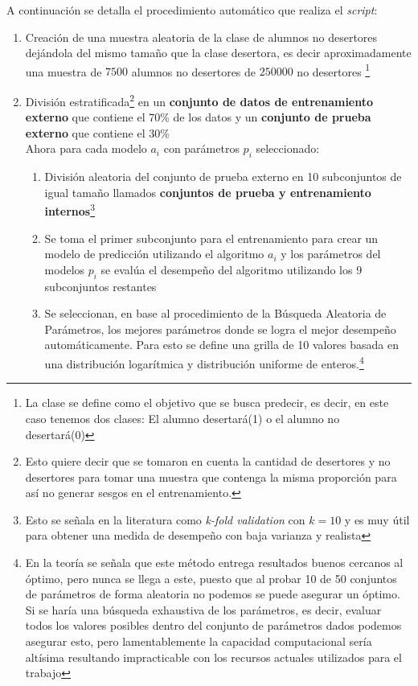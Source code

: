 \begin{enumerate}
A continuación se detalla el procedimiento automático que realiza el \textit{script}:\\
\begin{enumerate}
\item Creación de una muestra aleatoria de la clase de alumnos no desertores dejándola del mismo tamaño que la clase desertora, es decir aproximadamente una muestra de $7500$ alumnos no desertores de $250000$ no desertores \footnote{La clase se define como el objetivo que se busca predecir, es decir, en este caso tenemos dos clases: El alumno desertará(1) o el alumno no desertará(0)}
\item División estratificada\footnote{Esto quiere decir que se tomaron en cuenta la cantidad de desertores y no desertores para tomar una muestra que contenga la misma proporción para así no generar sesgos en el entrenamiento.} en un \textbf{conjunto de datos de entrenamiento externo} que contiene el 70\% de los datos y un \textbf{conjunto de prueba externo} que contiene el 30\%
\\ \hfill
Ahora para cada modelo $a_i$ con parámetros $p_i$ seleccionado:
    \begin{enumerate}
    \item División aleatoria del conjunto de prueba externo en 10 subconjuntos de igual tamaño llamados \textbf{conjuntos de prueba y entrenamiento internos}\footnote{Esto se señala en la literatura como \textit{k-fold validation} con $k = 10$ y es muy útil para obtener una medida de desempeño con baja varianza y realista}
    \item Se toma el primer subconjunto para el entrenamiento para crear un modelo de predicción utilizando el algoritmo $a_i$ y los parámetros del modelos $p_i$ se evalúa el desempeño del algoritmo utilizando los 9 subconjuntos restantes
    \item Se seleccionan, en base al procedimiento de la Búsqueda Aleatoria de Parámetros, los mejores parámetros donde se logra el mejor desempeño automáticamente. Para esto se define una grilla de 10 valores basada en una distribución logarítmica y distribución uniforme de enteros.\footnote{En la teoría se señala que este método entrega resultados buenos cercanos al óptimo, pero nunca se llega a este, puesto que al probar 10 de 50 conjuntos de parámetros de forma aleatoria no podemos se puede asegurar un óptimo. Si se haría una búsqueda exhaustiva de los parámetros, es decir, evaluar todos los valores posibles dentro del conjunto de parámetros dados podemos asegurar esto, pero lamentablemente la capacidad computacional sería altísima resultando impracticable con los recursos actuales utilizados para el trabajo} 

\end{enumerate}
\end{enumerate}
\end{enumerate}
